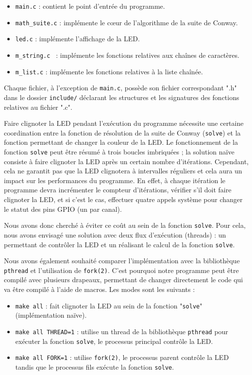 \documentclass[a4paper,11pt]{article}
\begin{document}
\begin{itemize}
    \item \texttt{main.c} : contient le point d'entrée du programme.
    \item \texttt{math\_suite.c} : implémente le cœur de l'algorithme de la suite de Conway.
    \item \texttt{led.c} : implémente l'affichage de la LED.
    \item \texttt{m\_string.c } : implémente les fonctions relatives aux chaînes de caractères.
    \item \texttt{m\_list.c} : implémente les fonctions relatives à la liste chaînée.
\end{itemize}

Chaque fichier, à l'exception de \texttt{main.c}, possède son fichier correspondant ".h" dans le dossier \texttt{include/} déclarant les structures et les signatures des fonctions relatives au fichier ".c".

Faire clignoter la LED pendant l'exécution du programme nécessite une certaine coordination entre la fonction de résolution de la suite de Conway (\texttt{solve}) et la fonction permettant de changer la couleur de la LED. Le fonctionnement de la fonction \texttt{solve} peut être résumé à trois boucles imbriquées ; la solution naïve consiste à faire clignoter la LED après un certain nombre d'itérations. Cependant, cela ne garantit pas que la LED clignotera à intervalles réguliers et cela aura un impact sur les performances du programme. En effet, à chaque itération le programme devra incrémenter le compteur d'itérations, vérifier s'il doit faire clignoter la LED, et si c'est le cas, effectuer quatre appels système pour changer le statut des pins GPIO (un par canal).

Nous avons donc cherché à éviter ce coût au sein de la fonction \texttt{solve}. Pour cela, nous avons envisagé une solution avec deux flux d'exécution (threads) : un permettant de contrôler la LED et un réalisant le calcul de la fonction \texttt{solve}. 

Nous avons également souhaité comparer l'implémentation avec la bibliothèque \texttt{pthread} et l'utilisation de \texttt{fork(2)}. C'est pourquoi notre programme peut être compilé avec plusieurs drapeaux, permettant de changer directement le code qui va être compilé à l'aide de macros. Les modes sont les suivants :

\begin{itemize}
    \item \texttt{make all} : fait clignoter la LED au sein de la fonction "\texttt{solve}" (implémentation naïve).
    \item \texttt{make all THREAD=1} : utilise un thread de la bibliothèque \texttt{pthread} pour exécuter la fonction \texttt{solve}, le processus principal contrôle la LED.
    \item \texttt{make all FORK=1} : utilise \texttt{fork(2)}, le processus parent contrôle la LED tandis que le processus fils exécute la fonction \texttt{solve}.
\end{itemize}
\end{document}
